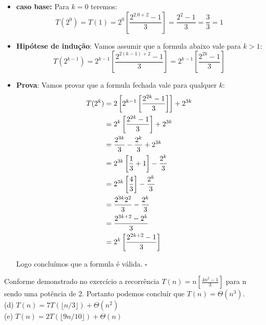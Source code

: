 \begin{itemize}
 \item \textbf{caso base:} Para $k = 0$ teremos:
 \[ T(2^0) = T(1) = 2^0 \left[ \frac{2^{2.0 + 2} - 1}{3} \right] = \frac{2^2 - 1}{3} =  \frac{3}{3} = 1\]
 \item \textbf{Hipótese de indução}: Vamos assumir que a formula abaixo vale para $k > 1$:
 \[ T(2^{k-1}) =  2^{k-1} \left[\frac{2^{2(k-1)+2} - 1}{3} \right] = 2^{k-1} \left[\frac{2^{2k} - 1}{3} \right] \]
 \item \textbf{Prova}: Vamos provar que a formula fechada vale para qualquer $k$:
 \begin{align*}
     T(2^{k}) &=  2 \left[ 2^{k-1} \left[\frac{2^{2k} - 1}{3}  \right] \right] + 2^{3k} \\
     \hspace{3mm} &= 2^{k} \left[\frac{2^{2k} - 1}{3} \right] + 2^{3k} \\
     \hspace{3mm} &= \frac{2^{3k}}{3} - \frac{2^k}{3} + 2^{3k} \\
     \hspace{3mm} &= 2^{3k} \left[ \frac{1}{3} + 1 \right] - \frac{2^k}{3} \\
     \hspace{3mm} &= 2^{3k} \left[ \frac{4}{3} \right] - \frac{2^k}{3} \\
     \hspace{3mm} &=  \frac{2^{3k}2^2}{3}  - \frac{2^k}{3} \\
     \hspace{3mm} &=  \frac{2^{3k + 2} - 2^k}{3} \\
     \hspace{3mm} &=  2^k \left[ \frac{2^{2k + 2} - 1}{3} \right]
 \end{align*}

Logo concluímos que a formula é válida. $\square$
\end{itemize}

Conforme demonstrado no exercício a recorrência $T(n) =  n \left[\frac{4n^2 - 1}{3} \right]$ para n sendo uma potência de 2. Portanto podemos concluír que $T(n) = \Theta(n^3)$. 
\\[6pt]
(d) $T(n) = 7T(\lfloor n/3 \rfloor) + \Theta(n^2)$ \\
(e) $T(n) = 2T(\lfloor 9n/10 \rfloor) + \Theta(n)$ \\